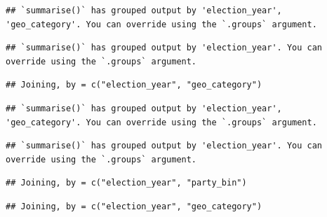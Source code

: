 \documentclass[10pt,]{article}
\author{\Large \vspace{0.05in} \newline\normalsize\emph{}  }
\date{}
\begin{document}
	
%




\vskip -8.5pt



\noindent \doublespacing 

\begin{verbatim}
## `summarise()` has grouped output by 'election_year', 'geo_category'. You can override using the `.groups` argument.
\end{verbatim}

\begin{verbatim}
## `summarise()` has grouped output by 'election_year'. You can override using the `.groups` argument.
\end{verbatim}

\begin{verbatim}
## Joining, by = c("election_year", "geo_category")
\end{verbatim}

\begin{verbatim}
## `summarise()` has grouped output by 'election_year', 'geo_category'. You can override using the `.groups` argument.
\end{verbatim}

\begin{verbatim}
## `summarise()` has grouped output by 'election_year'. You can override using the `.groups` argument.
\end{verbatim}

\begin{verbatim}
## Joining, by = c("election_year", "party_bin")
\end{verbatim}

\begin{verbatim}
## Joining, by = c("election_year", "geo_category")
\end{verbatim}
\end{document}
